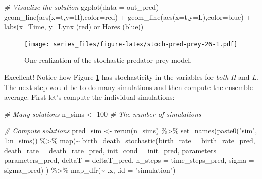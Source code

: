 \documentclass[
]{book}
\newenvironment{Shaded}{\begin{snugshade}}{\end{snugshade}}
\newcommand{\AttributeTok}[1]{\textcolor[rgb]{0.77,0.63,0.00}{#1}}
\newcommand{\CommentTok}[1]{\textcolor[rgb]{0.56,0.35,0.01}{\textit{#1}}}
\newcommand{\DecValTok}[1]{\textcolor[rgb]{0.00,0.00,0.81}{#1}}
\newcommand{\FunctionTok}[1]{\textcolor[rgb]{0.00,0.00,0.00}{#1}}
\newcommand{\NormalTok}[1]{#1}
\newcommand{\OtherTok}[1]{\textcolor[rgb]{0.56,0.35,0.01}{#1}}
\newcommand{\SpecialCharTok}[1]{\textcolor[rgb]{0.00,0.00,0.00}{#1}}
\newcommand{\StringTok}[1]{\textcolor[rgb]{0.31,0.60,0.02}{#1}}
\theoremstyle{definition}
\theoremstyle{definition}
\theoremstyle{definition}
\theoremstyle{remark}
\begin{document}
\begin{Shaded}
\begin{Highlighting}[]
\CommentTok{\# Visualize the solution}
\FunctionTok{ggplot}\NormalTok{(}\AttributeTok{data =}\NormalTok{ out\_pred) }\SpecialCharTok{+}
  \FunctionTok{geom\_line}\NormalTok{(}\FunctionTok{aes}\NormalTok{(}\AttributeTok{x=}\NormalTok{t,}\AttributeTok{y=}\NormalTok{H),}\AttributeTok{color=}\StringTok{\textquotesingle{}red\textquotesingle{}}\NormalTok{) }\SpecialCharTok{+}
  \FunctionTok{geom\_line}\NormalTok{(}\FunctionTok{aes}\NormalTok{(}\AttributeTok{x=}\NormalTok{t,}\AttributeTok{y=}\NormalTok{L),}\AttributeTok{color=}\StringTok{\textquotesingle{}blue\textquotesingle{}}\NormalTok{) }\SpecialCharTok{+}
\FunctionTok{labs}\NormalTok{(}\AttributeTok{x=}\StringTok{\textquotesingle{}Time\textquotesingle{}}\NormalTok{,}
     \AttributeTok{y=}\StringTok{\textquotesingle{}Lynx (red) or Hares (blue)\textquotesingle{}}\NormalTok{)}
\end{Highlighting}
\end{Shaded}

\begin{figure}
\centering
\texttt{[image: series\_files/figure-latex/stoch-pred-prey-26-1.pdf]}
\caption{\label{fig:stoch-pred-prey-26}One realization of the stochastic predator-prey model.}
\end{figure}

Excellent! Notice how Figure \ref{fig:stoch-pred-prey-26} has stochasticity in the variables for \emph{both} \emph{H} and \emph{L}. The next step would be to do many simulations and then compute the ensemble average. First let's compute the individual simulations:

\begin{Shaded}
\begin{Highlighting}[]
\CommentTok{\# Many solutions}
\NormalTok{n\_sims }\OtherTok{\textless{}{-}} \DecValTok{100}  \CommentTok{\# The number of simulations}

\CommentTok{\# Compute solutions}
\NormalTok{pred\_sim }\OtherTok{\textless{}{-}} \FunctionTok{rerun}\NormalTok{(n\_sims) }\SpecialCharTok{\%\textgreater{}\%}
  \FunctionTok{set\_names}\NormalTok{(}\FunctionTok{paste0}\NormalTok{(}\StringTok{"sim"}\NormalTok{, }\DecValTok{1}\SpecialCharTok{:}\NormalTok{n\_sims)) }\SpecialCharTok{\%\textgreater{}\%}
  \FunctionTok{map}\NormalTok{(}\SpecialCharTok{\textasciitilde{}} \FunctionTok{birth\_death\_stochastic}\NormalTok{(}\AttributeTok{birth\_rate =}\NormalTok{ birth\_rate\_pred,}
                                       \AttributeTok{death\_rate =}\NormalTok{ death\_rate\_pred,}
                                       \AttributeTok{init\_cond =}\NormalTok{ init\_pred,}
                                       \AttributeTok{parameters =}\NormalTok{ parameters\_pred,}
                                       \AttributeTok{deltaT =}\NormalTok{ deltaT\_pred,}
                                       \AttributeTok{n\_steps =}\NormalTok{ time\_steps\_pred,}
                                       \AttributeTok{sigma =}\NormalTok{ sigma\_pred)}
\NormalTok{) }\SpecialCharTok{\%\textgreater{}\%}
  \FunctionTok{map\_dfr}\NormalTok{(}\SpecialCharTok{\textasciitilde{}}\NormalTok{ .x, }\AttributeTok{.id =} \StringTok{"simulation"}\NormalTok{)}
\end{Highlighting}
\end{Shaded}
\end{document}
